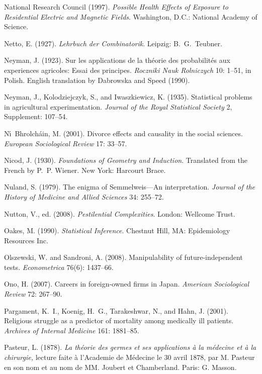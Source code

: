 \smallskip\noindent
National Research Council (1997).
{\it Possible Health Effects of Exposure to Residential Electric and Magnetic Fields\/}.
Washington, D.C.: National Academy of Science.

\smallskip\noindent
Netto, E. (1927).
{\it Lehrbuch der Combinatorik\/}.
Leipzig: B.~G.~Teubner.

\smallskip\noindent
Neyman, J. (1923).
Sur les applications de la th\'eorie des probabilit\'es aux experiences agricoles:
Essai des principes.
{\it Roczniki Nauk Rolniczych\/} 10: 1--51, in Polish.
English translation by Dabrowska and Speed (1990).

\smallskip\noindent
Neyman, J., Kolodziejczyk, S., and Iwaszkiewicz, K. (1935).
Statistical problems in agricultural experimentation.
{\it Journal of the Royal Statistical Society\/} {2}, Supplement: 107--54.

\smallskip\noindent
N\'\i\ Bhrolch\'ain, M. (2001).
Divorce effects and causality in the social sciences.
{\it European Sociological Review\/} 17: 33--57.

\smallskip\noindent
Nicod, J. (1930).
{\it Foundations of Geometry and Induction\/}.
Translated from the French by P.~P. Wiener.
New York: Harcourt Brace. %

\smallskip\noindent
Nuland, S. (1979).
The enigma of Semmelweis---An interpretation.
{\it Journal of the History of Medicine and Allied Sciences\/} 34: 255--72.

\smallskip\noindent
Nutton, V., ed. (2008).
{\it Pestilential Complexities\/}.
London: Wellcome Trust.

\smallskip\noindent
Oakes, M. (1990).
{\it Statistical Inference\/}.
Chestnut Hill, MA: Epidemiology Resources Inc.

\smallskip\noindent
Olszewski, W. and Sandroni, A. (2008).
Manipulability of future-indepen\-dent tests.
{\it Econometrica\/} 76(6): 1437--66.

\smallskip\noindent
Ono, H. (2007).
Careers in foreign-owned firms in Japan.
{\it American Sociological Review\/} 72: 267--90.

\smallskip\noindent
Pargament, K.~I., Koenig, H.~G., Tarakeshwar, N., and Hahn, J. (2001).
Religious struggle as a predictor of mortality among medically ill patients.
{\it Archives of Internal Medicine\/} 161: 1881--85.

\smallskip\noindent
Pasteur, L. (1878).
{\it La th\'eorie des germes et ses applications \`a la m\'edecine et \`a la chirurgie,\/}
lecture faite \`a l'Academie de M\'edecine le 30 avril 1878,
par M. Pasteur en son nom et au nom de MM. Joubert et Chamberland.
Paris: G. Masson.

